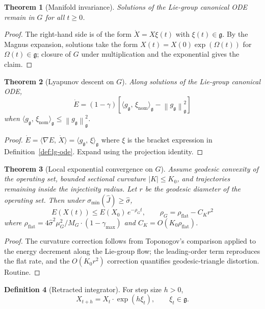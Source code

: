 \documentclass[11pt,a4paper]{article}
\newtheorem{theorem}{Theorem}[section]
\theoremstyle{definition}
\newtheorem{definition}[theorem]{Definition}
\newcommand{\norm}[1]{\left\|#1\right\|}
\newcommand{\inner}[2]{\langle #1,\,#2\rangle}
\newcommand{\nom}{\mathrm{nom}}
\newcommand{\fr}{\mathfrak}
\begin{document}
\begin{theorem}[Manifold invariance]
\label{thm:lg1}
Solutions of the Lie-group canonical ODE remain in $G$ for all $t \geq 0$.
\end{theorem}

\begin{proof}
The right-hand side is of the form $\dot X = X\xi(t)$ with $\xi(t) \in \fr{g}$. By the Magnus expansion, solutions take the form $X(t) = X(0)\exp(\Omega(t))$ for $\Omega(t) \in \fr{g}$; closure of $G$ under multiplication and the exponential gives the claim.
\end{proof}

\begin{theorem}[Lyapunov descent on $G$]
\label{thm:lg2}
Along solutions of the Lie-group canonical ODE,
\[
\dot E = (1-\gamma)\!\left[\inner{g_\fr{g}}{\xi_\nom}_\fr{g} - \norm{g_\fr{g}}^2_\fr{g}\right]
\]
when $\inner{g_\fr{g}}{\xi_\nom}_\fr{g} \leq \norm{g_\fr{g}}^2_\fr{g}$.
\end{theorem}

\begin{proof}
$\dot E = \inner{\nabla E}{\dot X} = \inner{g_\fr{g}}{\xi}_\fr{g}$ where $\xi$ is the bracket expression in Definition~\ref{def:lg-ode}. Expand using the projection identity.
\end{proof}

\begin{theorem}[Local exponential convergence on $G$]
\label{thm:lg3}
Assume geodesic convexity of the operating set, bounded sectional curvature $|K| \leq K_0$, and trajectories remaining inside the injectivity radius. Let $r$ be the geodesic diameter of the operating set. Then under $\sigma_{\min}(\hat J) \geq \hat \sigma$,
\[
E(X(t)) \leq E(X_0)\,e^{-\rho_G t}, \qquad
\rho_G = \rho_{\mathrm{flat}} - C_K r^2
\]
where $\rho_{\mathrm{flat}} = 4\hat\sigma^2 \mu_G^2 / M_G \cdot (1-\gamma_{\max})$ and $C_K = O(K_0 \rho_{\mathrm{flat}})$.
\end{theorem}

\begin{proof}
The curvature correction follows from Toponogov's comparison applied to the energy decrement along the Lie-group flow; the leading-order term reproduces the flat rate, and the $O(K_0 r^2)$ correction quantifies geodesic-triangle distortion. Routine.
\end{proof}

\begin{definition}[Retracted integrator]
For step size $h > 0$,
\[
X_{t+h} = X_t \cdot \exp(h\xi_t), \qquad \xi_t \in \fr{g}.
\]
\end{definition}
\end{document}
